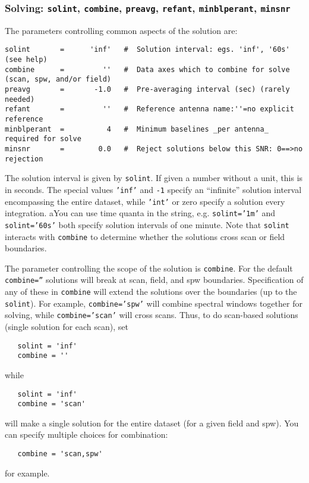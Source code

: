 \subsubsection{Solving: {\tt solint}, {\tt combine},
{\tt preavg}, {\tt refant}, {\tt minblperant}, {\tt minsnr} }
\label{section:cal.solve.pars.solving}

The parameters controlling common aspects of the solution are:
\small
\begin{verbatim}
solint       =      'inf'   #  Solution interval: egs. 'inf', '60s' (see help)
combine      =         ''   #  Data axes which to combine for solve (scan, spw, and/or field)
preavg       =       -1.0   #  Pre-averaging interval (sec) (rarely needed)
refant       =         ''   #  Reference antenna name:''=no explicit reference
minblperant  =          4   #  Minimum baselines _per antenna_ required for solve
minsnr       =        0.0   #  Reject solutions below this SNR: 0==>no rejection
\end{verbatim} 
\normalsize

The solution interval is given by {\tt solint}.  If given a number
without a unit, this is in seconds.  
The special values {\tt 'inf'} and {\tt -1} specify an ``infinite''
solution interval encompassing the entire dataset,
while {\tt 'int'} or zero specify a solution every integration.
aYou can use time quanta in the string,
e.g. {\tt solint='1m'} and {\tt solint='60s'} both specify solution
intervals of one minute.  Note that {\tt solint} interacts with 
{\tt combine} to determine whether the solutions cross scan or field
boundaries.

The parameter controlling the scope of the solution is {\tt combine}.
For the default {\tt combine=''} solutions will break at scan, field, and spw
boundaries.  Specification of any of these in {\tt combine} will
extend the solutions over the boundaries (up to the {\tt solint}). 
For example, {\tt combine='spw'} will combine spectral windows
together for solving, while {\tt combine='scan'} will cross scans.  
Thus, to do scan-based solutions (single solution for each scan), set
\small
\begin{verbatim}
   solint = 'inf'
   combine = ''
\end{verbatim} 
\normalsize
while
\small
\begin{verbatim}
   solint = 'inf'
   combine = 'scan'
\end{verbatim} 
\normalsize
will make a single solution for the entire dataset (for a given field
and spw).  You can specify multiple choices for combination:
\small
\begin{verbatim}
   combine = 'scan,spw'
\end{verbatim} 
\normalsize
for example.

